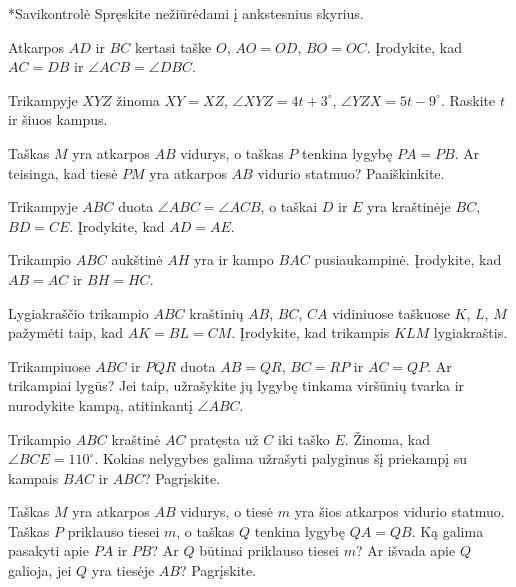 \documentclass[12pt,a4paper,reqno]{amsart}
\makeatletter
\def\section{\@startsection{section}{1}{\z@}{-1.5\baselineskip plus -.3\baselineskip minus -.2\baselineskip}{0.6\baselineskip}{\normalfont\large\bfseries\raggedright}}
\theoremstyle{plain}\newtheorem{theorem}{Teorema}[section]
\theoremstyle{definition}
\theoremstyle{remark}\newtheorem{remark}[theorem]{Pastaba}\newtheorem*{remark*}{Pastaba}
\theoremstyle{definition}\newtheorem*{problem*}{Uždavinys}
\makeatother
\begin{document}
\section*{Savikontrolė}
\setcounter{theorem}{0}\renewcommand{\thetheorem}{S\arabic{theorem}}\renewcommand{\theHtheorem}{S\arabic{theorem}}
Spręskite nežiūrėdami į ankstesnius skyrius.
\begin{problem}\label{uzd:savikontrole-01} Atkarpos $AD$ ir $BC$ kertasi taške $O$, $AO=OD$, $BO=OC$. Įrodykite, kad $AC=DB$ ir $\angle ACB=\angle DBC$. \end{problem}
\begin{problem}\label{uzd:savikontrole-02} Trikampyje $XYZ$ žinoma $XY=XZ$, $\angle XYZ=4t+3^\circ$, $\angle YZX=5t-9^\circ$. Raskite $t$ ir šiuos kampus. \end{problem}
\begin{problem}\label{uzd:savikontrole-03} Taškas $M$ yra atkarpos $AB$ vidurys, o taškas $P$ tenkina lygybę $PA=PB$. Ar teisinga, kad tiesė $PM$ yra atkarpos $AB$ vidurio statmuo? Paaiškinkite. \end{problem}
\begin{problem}\label{uzd:savikontrole-04} Trikampyje $ABC$ duota $\angle ABC=\angle ACB$, o taškai $D$ ir $E$ yra kraštinėje $BC$, $BD=CE$. Įrodykite, kad $AD=AE$. \end{problem}
\begin{problem}\label{uzd:savikontrole-05} Trikampio $ABC$ aukštinė $AH$ yra ir kampo $BAC$ pusiaukampinė. Įrodykite, kad $AB=AC$ ir $BH=HC$. \end{problem}
\begin{problem}\label{uzd:savikontrole-06} Lygiakraščio trikampio $ABC$ kraštinių $AB$, $BC$, $CA$ vidiniuose taškuose $K$, $L$, $M$ pažymėti taip, kad $AK=BL=CM$. Įrodykite, kad trikampis $KLM$ lygiakraštis. \end{problem}
\begin{problem}\label{uzd:savikontrole-07} Trikampiuose $ABC$ ir $PQR$ duota $AB=QR$, $BC=RP$ ir $AC=QP$. Ar trikampiai lygūs? Jei taip, užrašykite jų lygybę tinkama viršūnių tvarka ir nurodykite kampą, atitinkantį $\angle ABC$. \end{problem}
\begin{problem}\label{uzd:savikontrole-08} Trikampio $ABC$ kraštinė $AC$ pratęsta už $C$ iki taško $E$. Žinoma, kad $\angle BCE=110^\circ$. Kokias nelygybes galima užrašyti palyginus šį priekampį su kampais $BAC$ ir $ABC$? Pagrįskite. \end{problem}
\begin{problem}\label{uzd:savikontrole-09} Taškas $M$ yra atkarpos $AB$ vidurys, o tiesė $m$ yra šios atkarpos vidurio statmuo. Taškas $P$ priklauso tiesei $m$, o taškas $Q$ tenkina lygybę $QA=QB$. Ką galima pasakyti apie $PA$ ir $PB$? Ar $Q$ būtinai priklauso tiesei $m$? Ar išvada apie $Q$ galioja, jei $Q$ yra tiesėje $AB$? Pagrįskite. \end{problem}
\end{document}
